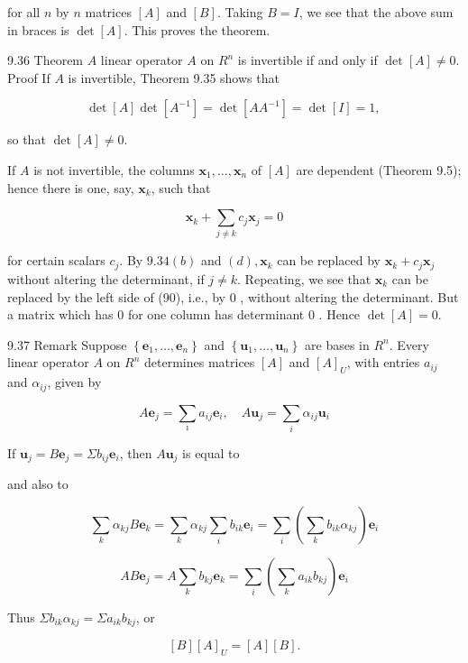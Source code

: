 \documentclass[10pt]{article}
\begin{document}
for all $n$ by $n$ matrices $[A]$ and $[B]$. Taking $B=I$, we see that the above sum in braces is $\operatorname{det}[A]$. This proves the theorem.

9.36 Theorem $A$ linear operator $A$ on $R^{n}$ is invertible if and only if $\operatorname{det}[A] \neq 0$. Proof If $A$ is invertible, Theorem 9.35 shows that

$$
\operatorname{det}[A] \operatorname{det}\left[A^{-1}\right]=\operatorname{det}\left[A A^{-1}\right]=\operatorname{det}[I]=1 \text {, }
$$

so that $\operatorname{det}[A] \neq 0$.

If $A$ is not invertible, the columns $\mathbf{x}_{1}, \ldots, \mathbf{x}_{n}$ of $[A]$ are dependent (Theorem 9.5); hence there is one, say, $\mathbf{x}_{k}$, such that

$$
\mathbf{x}_{k}+\sum_{j \neq k} c_{j} \mathbf{x}_{j}=0
$$

for certain scalars $c_{j}$. By $9.34(b)$ and $(d), \mathbf{x}_{k}$ can be replaced by $\mathbf{x}_{k}+c_{j} \mathbf{x}_{j}$ without altering the determinant, if $j \neq k$. Repeating, we see that $\mathbf{x}_{k}$ can be replaced by the left side of (90), i.e., by 0 , without altering the determinant. But a matrix which has 0 for one column has determinant 0 . Hence $\operatorname{det}[A]=0$.

9.37 Remark Suppose $\left\{\mathbf{e}_{1}, \ldots, \mathbf{e}_{n}\right\}$ and $\left\{\mathbf{u}_{1}, \ldots, \mathbf{u}_{n}\right\}$ are bases in $R^{n}$. Every linear operator $A$ on $R^{n}$ determines matrices $[A]$ and $[A]_{U}$, with entries $a_{i j}$ and $\alpha_{i j}$, given by

$$
A \mathbf{e}_{j}=\sum_{\imath} a_{i j} \mathbf{e}_{i}, \quad A \mathbf{u}_{j}=\sum_{i} \alpha_{i j} \mathbf{u}_{i}
$$

If $\mathbf{u}_{j}=B \mathbf{e}_{j}=\Sigma b_{i j} \mathbf{e}_{i}$, then $A \mathbf{u}_{j}$ is equal to

and also to

$$
\sum_{k} \alpha_{k j} B \mathbf{e}_{k}=\sum_{k} \alpha_{k j} \sum_{i} b_{i k} \mathbf{e}_{i}=\sum_{i}\left(\sum_{k} b_{i k} \alpha_{k j}\right) \mathbf{e}_{i}
$$

$$
A B \mathbf{e}_{j}=A \sum_{k} b_{k j} \mathbf{e}_{k}=\sum_{i}\left(\sum_{k} a_{i k} b_{k j}\right) \mathbf{e}_{i}
$$

Thus $\Sigma b_{i k} \alpha_{k j}=\Sigma a_{i k} b_{k j}$, or

$$
[B][A]_{U}=[A][B] .
$$
\end{document}
